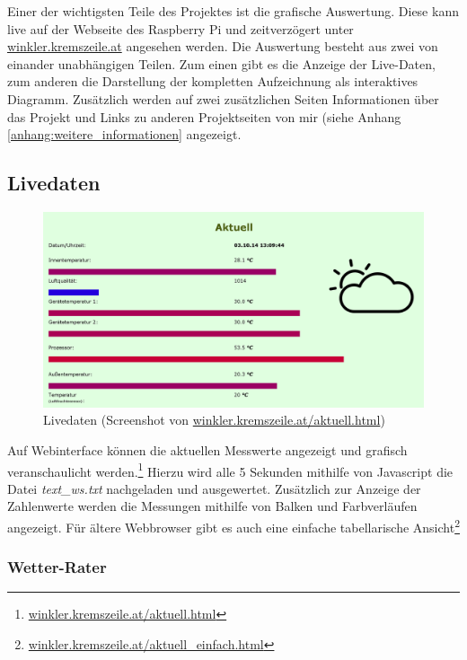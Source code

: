 Einer der wichtigsten Teile des Projektes ist die grafische Auswertung. Diese kann live auf der Webseite des Raspberry Pi und zeitverzögert unter \href{http://winkler.kremszeile.at}{winkler.kremszeile.at} angesehen werden. Die Auswertung besteht aus zwei von einander unabhängigen Teilen. Zum einen gibt es die Anzeige der Live-Daten, zum anderen die Darstellung der kompletten Aufzeichnung als interaktives Diagramm. Zusätzlich werden auf zwei zusätzlichen Seiten Informationen über das Projekt und Links zu anderen Projektseiten von mir (siehe Anhang \ref{anhang:weitere_informationen} angezeigt.

\subsection{Livedaten}
\label{subsec:Livedaten}

\begin{figure}[h]
  \centering
     \includegraphics[width=\textwidth]{figures/aktuell.png}
  \caption{Livedaten (Screenshot von \href{http://winkler.kremszeile.at/aktuell.html}{winkler.kremszeile.at/aktuell.html})}
  \label{fig:livedaten}
\end{figure}

Auf Webinterface können die aktuellen Messwerte angezeigt und grafisch veranschaulicht werden.\footnote{\href{http://winkler.kremszeile.at/aktuell.html}{winkler.kremszeile.at/aktuell.html}}
Hierzu wird alle 5 Sekunden mithilfe von \gls{Javascript} die Datei \emph{text\_ws.txt} nachgeladen und ausgewertet. Zusätzlich zur Anzeige der Zahlenwerte werden die Messungen mithilfe von Balken und Farbverläufen angezeigt. Für ältere Webbrowser gibt es auch eine einfache tabellarische Ansicht\footnote{\href{http://winkler.kremszeile.at/aktuell_einfach.html}{winkler.kremszeile.at/aktuell\_einfach.html}}

\subsubsection{Wetter-Rater}
\label{subsubsec:Wetterrater}


